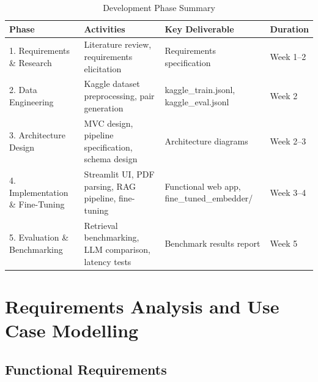 \begin{table}[H]

\centering

\caption{Development Phase Summary}

\label{tab:phases}

\begin{tabular}{|p{3.5cm}|p{4cm}|p{3.5cm}|p{2cm}|}

\hline

\textbf{Phase} & \textbf{Activities} & \textbf{Key Deliverable} & \textbf{Duration} \\

\hline

1. Requirements \& Research & Literature review, requirements elicitation & Requirements specification & Week 1–2 \\

\hline

2. Data Engineering & Kaggle dataset preprocessing, pair generation & kaggle\_train.jsonl, kaggle\_eval.jsonl & Week 2 \\

\hline

3. Architecture Design & MVC design, pipeline specification, schema design & Architecture diagrams & Week 2–3 \\

\hline

4. Implementation \& Fine-Tuning & Streamlit UI, PDF parsing, RAG pipeline, fine-tuning & Functional web app, fine\_tuned\_embedder/ & Week 3–4 \\

\hline

5. Evaluation \& Benchmarking & Retrieval benchmarking, LLM comparison, latency tests & Benchmark results report & Week 5 \\

\hline

\end{tabular}

\end{table}

\section{Requirements Analysis and Use Case Modelling}

\subsection{Functional Requirements}

